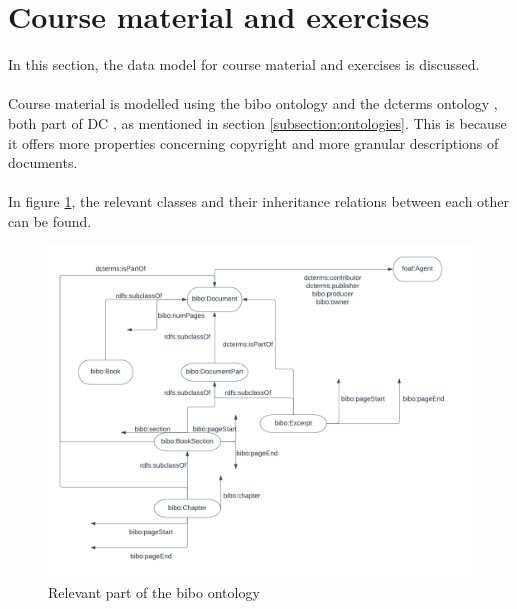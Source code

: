 \documentclass[a4paper]{report}
\begin{document}
    \section{Course material and exercises}
    \label{subsection:coursematerial}
    In this section, the data model for course material and exercises is discussed.\\ \\
    Course material is modelled using the bibo ontology \cite{bibo} and the dcterms ontology \cite{dcterms}, both part of DC \cite{dc}, as mentioned in section \ref{subsection:ontologies}.
    This is because it offers more properties concerning copyright and more granular descriptions of documents.\\ \\
    In figure \ref{fig:uml-bibo}, the relevant classes and their inheritance relations between each other can be found.

    \begin{figure}[h]
        \caption{Relevant part of the bibo ontology}
        \label{fig:uml-bibo}
        \includegraphics[scale=0.5]{uml-coursematerial.png}
    \end{figure}
\end{document}
